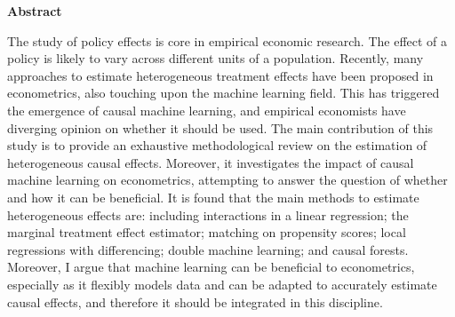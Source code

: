 \thispagestyle{plain}
\begin{center}
\large{\textbf{Abstract}}
\end{center}

The study of policy effects is core in empirical economic research. The effect of a policy is likely to vary across different units of a population. Recently, many approaches to estimate heterogeneous treatment effects have been proposed in econometrics, also touching upon the machine learning field. This has triggered the emergence of causal machine learning, and empirical economists have diverging opinion on whether it should be used. The main contribution of this study is to provide an exhaustive methodological review on the estimation of heterogeneous causal effects. Moreover, it investigates the impact of causal machine learning on econometrics, attempting to answer the question of whether and how it can be beneficial. It is found that the main methods to estimate heterogeneous effects are: including interactions in a linear regression; the marginal treatment effect estimator; matching on propensity scores; local regressions with differencing; double machine learning; and causal forests.  
Moreover, I argue that machine learning can be beneficial to econometrics, especially as it flexibly models data and can be adapted to accurately estimate causal effects, and therefore it should be integrated in this discipline. 